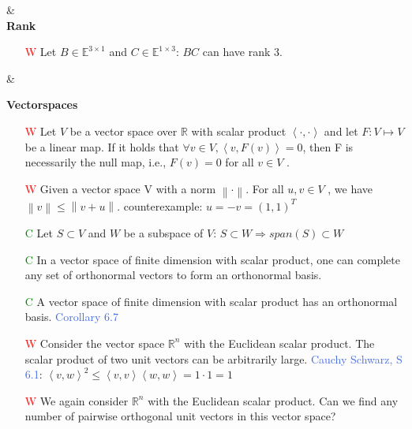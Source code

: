 \documentclass[7pt,landscape, margin = 0.1mm]{article}
\begin{document}
\begin{multicols}{4}
\begin{flushleft}
\begin{itemize}
\end{itemize}

\hspace{0.5mm}
\hline & \\[3mm]
\scriptsize
\textbf{Rank}
\tiny \\
\begin{itemize}
\item[\textcolor{red}{W}] Let $B \in \mathbb{E}^{3 \times 1}$ and $C \in \mathbb{E}^{1 \times 3}$: $BC$ can have rank $3$.

\end{itemize}
\hspace{3mm}
\hline & \\[3mm]
\scriptsize

\textbf{Vectorspaces}
\tiny \\
\begin{itemize}
\item[\textcolor{red}{W}]Let $V$ be a vector space over $\mathbb{R}$ with scalar product $\left< \cdot, \cdot \right> $ and let $F : V \mapsto V$ be a linear map. If it
holds that $\forall v \in V, \left< v, F(v) \right> = 0$, then F is necessarily the null map, i.e., $F(v) = 0 $ for all  $v \in V$ .  
\item[\textcolor{red}{W}] 
Given a vector space V with a norm $\left\| \cdot \right\|$. For all $ u,v \in V $ , we have $\left\| v \right\| \leq \left\| v+u \right\|$.
\textcolor{Emerald}{counterexample: $u=-v= (1 ,1)^T$ }
\item[\textcolor{green}{C}] Let $S \subset V $ and $W $ be a subspace of $V $: $S \subset W \Rightarrow span(S) \subset W$

\item[\textcolor{green}{C}] In a vector space of finite dimension with scalar product, one can complete any set of orthonormal
vectors to form an orthonormal basis.


\item[\textcolor{green}{C}] A vector space of finite dimension with scalar product has an orthonormal basis. \textcolor{RoyalBlue}{Corollary 6.7}
\item[\textcolor{red}{W}] Consider the vector space $\mathbb{R}^n$ with the Euclidean scalar product. The scalar product of two unit
vectors can be arbitrarily large.
\textcolor{Emerald}{\textcolor{RoyalBlue}{Cauchy Schwarz, S 6.1}: $\left< v,w\right>^2 \leq \left< v,v\right>\left<w,w \right> = 1 \cdot 1 = 1$}
\item[\textcolor{red}{W}] We again consider $\mathbb{R}^n$ with the Euclidean scalar product. Can we find any number of pairwise
orthogonal unit vectors in this vector space?


\end{itemize}
\end{flushleft}
\end{multicols}
\end{document}

